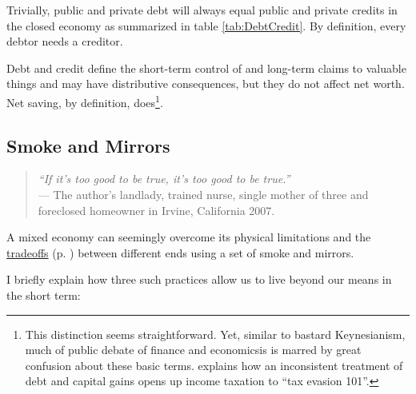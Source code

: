 \begin{enumerate}
	Trivially, public and private debt will always equal public and private credits in the closed economy as summarized in table \ref{tab:DebtCredit}. By definition, every debtor needs a creditor. 
	
	Debt and credit define the short-term control of and long-term claims to valuable things and may have distributive consequences, but they do not affect net worth. Net saving, by definition, does\footnote{
		This distinction seems straightforward. Yet, similar to bastard Keynesianism, much of public debate of finance and economicsis is marred by great confusion about these basic terms. \citealt{McCaffery2005} explains how an inconsistent treatment of debt and capital gains opens up income taxation to ``tax evasion 101''.}.%
\end{enumerate}

\subsection[Smoke and Mirrors]{Smoke and Mirrors} \label{sec:smokenmirrors}

\begin{quote}
	\emph{``If it's too good to be true, it's too good to be true.''\\}
	--- The author's landlady, trained nurse, single mother of three and foreclosed homeowner in Irvine, California 2007.
\end{quote}

A mixed economy can seemingly overcome its physical limitations and the \hyperref[sec:tradeoffs]{tradeoffs} (p. \pageref{sec:tradeoffs}) between different ends using a set of smoke and mirrors. 

I briefly explain how three such practices allow us to live beyond our means in the short term:

